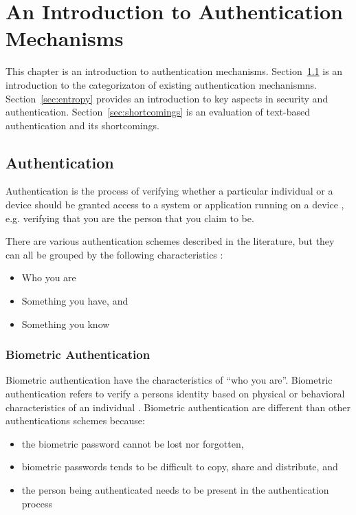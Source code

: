   \chapter{An Introduction to Authentication Mechanisms}
  
    This chapter is an introduction to authentication mechanisms. Section~\ref{sec:authentication} is an introduction to the categorizaton of existing authentication mechanismns. Section~\ref{sec:entropy} provides an introduction to key aspects in security and authentication. Section~\ref{sec:shortcomings} is an evaluation of text-based authentication and its shortcomings.

  \clearpage

  \section{Authentication} \label{sec:authentication}

  Authentication is the process of verifying whether a particular individual or a device should be granted access to a system or application running on a device \cite{IPAS}, e.g. verifying that you are the person that you claim to be.

  There are various authentication schemes described in the literature, but they can all be grouped by the following characteristics \cite{IPAS}:

    \begin{itemize}
      \item Who you are
      \item Something you have, and
      \item Something you know
    \end{itemize}

    \subsection{Biometric Authentication}
    Biometric authentication have the characteristics of ``who you are''. Biometric authentication refers to verify a persons identity based on physical or behavioral characteristics of an individual \cite{biometrics, biometrics2}. Biometric authentication are different than other authentications schemes because:

      \begin{itemize}
        \item the biometric password cannot be lost nor forgotten,
        \item biometric passwords tends to be difficult to copy, share and distribute, and 
        \item the person being authenticated needs to be present in the authentication process
      \end{itemize} 

